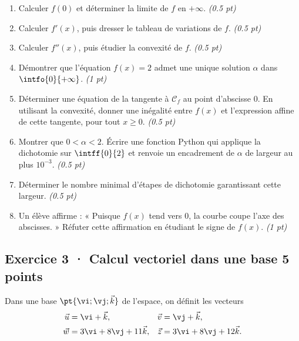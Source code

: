 \begin{enumerate}

\item Calculer $f(0)$ et déterminer la limite de $f$ en $+\infty$. \hfill\textit{(\num{0,5} pt)}

\item Calculer $f' (x)$, puis dresser le tableau de variations de $f$. \hfill\textit{(\num{0,5} pt)}

\item Calculer $f'' (x)$, puis étudier la convexité de $f$. \hfill\textit{(\num{0,5} pt)}

\item Démontrer que l'équation $f(x)=2$ admet une unique solution $\alpha$ dans $\intfo{0}{+\infty}$. \hfill\textit{(1 pt)}

\item Déterminer une équation de la tangente à $\mathcal C_f$ au point d'abscisse $0$. En utilisant la convexité, donner une inégalité entre $f(x)$ et l'expression affine de cette tangente, pour tout $x\ge0$. \hfill\textit{(\num{0,5} pt)}

\item Montrer que $0<\alpha<2$. Écrire une fonction Python qui applique la dichotomie sur $\intff{0}{2}$ et renvoie un encadrement de $\alpha$ de largeur au plus $10^{-3}$. \hfill\textit{(\num{0,5} pt)}

\item Déterminer le nombre minimal d'étapes de dichotomie garantissant cette largeur. \hfill\textit{(\num{0,5} pt)}

\item Un élève affirme : « Puisque $f(x)$ tend vers $0$, la courbe coupe l'axe des abscisses. » Réfuter cette affirmation en étudiant le signe de $f(x)$. \hfill\textit{(1 pt)}

\end{enumerate}

\mxnewpage{}

\subsection*{Exercice 3 · Calcul vectoriel dans une base \hfill 5 points}Dans une base $\pt{\vi;\vj;\vec k}$ de l'espace, on définit les vecteurs
\[\begin{aligned}\vec u&=\vi+\vec k,&\vec v&=\vj+\vec k,\\
\vec w&=3\vi+8\vj+11\vec k,&\vec z&=3\vi+8\vj+12\vec k.\end{aligned}\]

